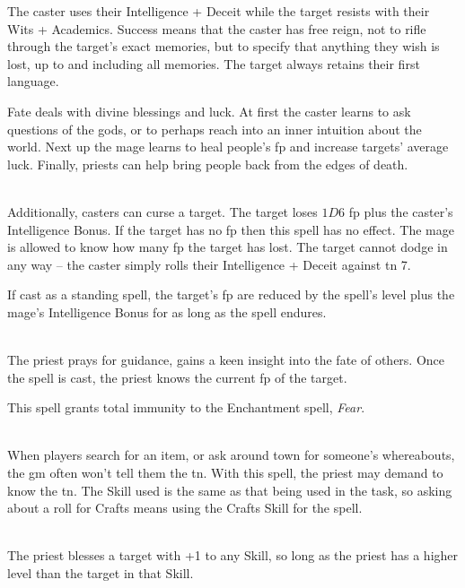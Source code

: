 \begin{multicols}{2}
The caster uses their Intelligence + Deceit while the target resists with their Wits + Academics.
Success means that the caster has free reign, not to rifle through the target's exact memories, but to specify that anything they wish is lost, up to and including all memories.
The target always retains their first language.

\end{multicols}

Fate deals with divine blessings and luck. At first the caster learns to ask questions of the gods, or to perhaps reach into an inner intuition about the world. Next up the mage learns to heal people's \gls{fp} and increase targets' average luck. Finally, priests can help bring people back from the edges of death.

\begin{multicols}{2}

\spelllevel

\\
Additionally, casters can curse a target. The target loses $1D6$ \gls{fp} plus the caster's Intelligence Bonus. If the target has no \gls{fp} then this spell has no effect. The mage is allowed to know how many \gls{fp} the target has lost. The target cannot dodge in any way -- the caster simply rolls their Intelligence + Deceit against \gls{tn} 7.

If cast as a standing spell, the target's \gls{fp} are reduced by the spell's level plus the mage's Intelligence Bonus for as long as the spell endures.

\\
The priest prays for guidance, gains a keen insight into the fate of others.
Once the spell is cast, the priest knows the current \gls{fp} of the target.

This spell grants total immunity to the Enchantment spell, \textit{Fear}.

\\
When players search for an item, or ask around town for someone's whereabouts, the \gls{gm} often won't tell them the \gls{tn}.  With this spell, the priest may demand to know the \gls{tn}.  The Skill used is the same as that being used in the task, so asking about a roll for Crafts means using the Crafts Skill for the spell.

\\
The priest blesses a target with +1 to any Skill, so long as the priest has a higher level than the target in that Skill.


\end{multicols}

